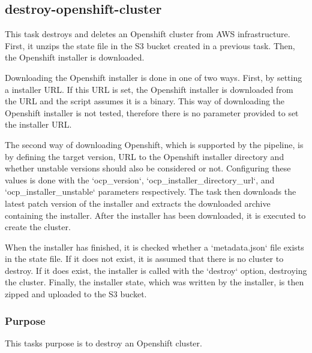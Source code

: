 \subsection{destroy-openshift-cluster}\label{subsec:destroy-openshift-cluster}

This task destroys and deletes an Openshift cluster from AWS infrastructure.
First, it unzips the state file in the S3 bucket created in a previous task.
Then, the Openshift installer is downloaded.

Downloading the Openshift installer is done in one of two ways.
First, by setting a installer URL.
If this URL is set, the Openshift installer is downloaded from the URL and the script assumes it is a binary.
This way of downloading the Openshift installer is not tested, therefore there is no parameter provided to set the installer URL.

The second way of downloading Openshift, which is supported by the pipeline, is by defining the target version, URL to the Openshift installer directory and whether unstable versions should also be considered or not.
Configuring these values is done with the `{ocp_version}`, `{ocp_installer_directory_url}`, and `{ocp_installer_unstable}` parameters respectively.
The task then downloads the latest patch version of the installer and extracts the downloaded archive containing the installer.
After the installer has been downloaded, it is executed to create the cluster.

When the installer has finished, it is checked whether a `metadata.json` file exists in the state file.
If it does not exist, it is assumed that there is no cluster to destroy.
If it does exist, the installer is called with the `destroy` option, destroying the cluster.
Finally, the installer state, which was written by the installer, is then zipped and uploaded to the S3 bucket.

\subsubsection{Purpose}\label{subsubsec:destroy-oc-Purpose}

This tasks purpose is to destroy an Openshift cluster.

